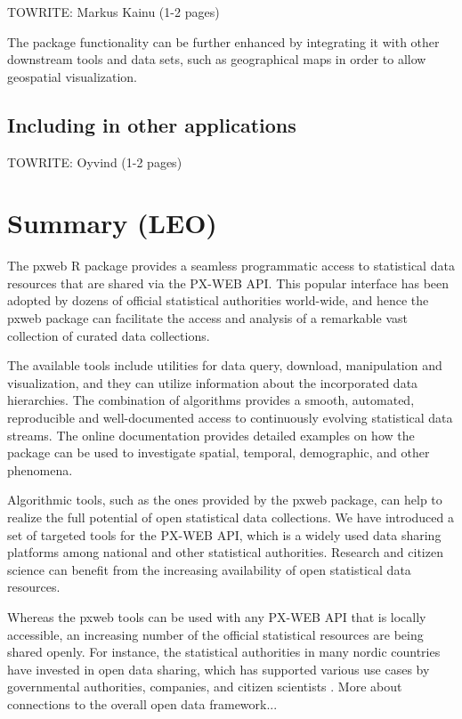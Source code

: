 TOWRITE: Markus Kainu (1-2 pages)

The package functionality can be further enhanced by integrating it with other downstream tools and data sets, such as geographical maps in order to allow geospatial visualization.


\subsection{Including  in other applications}

TOWRITE: Oyvind (1-2 pages)

\section[summary]{Summary (LEO)}

The pxweb R package provides a seamless programmatic access to statistical data resources that are shared via the PX-WEB API. This popular interface has been adopted by dozens of official statistical authorities world-wide, and hence the pxweb package can facilitate the access and analysis of a remarkable vast collection of curated data collections. 

The available tools include utilities for data query, download, manipulation and visualization, and they can utilize information about the incorporated data hierarchies. The combination of algorithms provides a smooth, automated, reproducible and well-documented access to continuously evolving statistical data streams. The online documentation provides detailed examples on how the package can be used to investigate spatial, temporal, demographic, and other phenomena.

Algorithmic tools, such as the ones provided by the pxweb package, can help to realize the full potential of open statistical data collections. We have introduced a set of targeted tools for the PX-WEB API, which is a widely used data sharing platforms among national and other statistical authorities. Research and citizen science can benefit from the increasing availability of open statistical data resources. 

Whereas the pxweb tools can be used with any PX-WEB API that is locally accessible, an increasing number of the official statistical resources are being shared openly. For instance, the statistical authorities in many nordic countries have invested in open data sharing, which has supported various use cases by governmental authorities, companies, and citizen scientists \cite{xxx}. More about connections to the overall open data framework...

